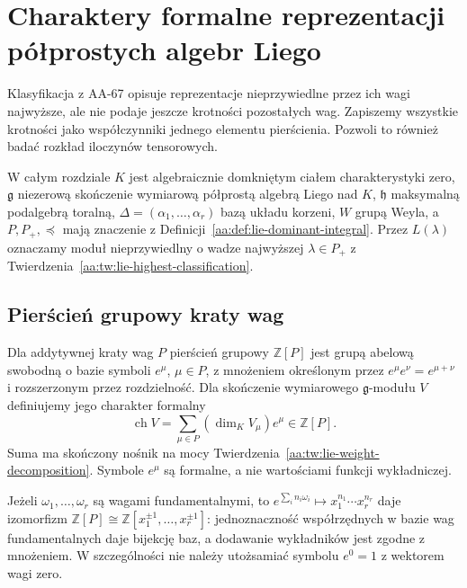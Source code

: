 \chapter[Charaktery reprezentacji]{Charaktery formalne reprezentacji półprostych algebr Liego}
\label{aa:ch:lie-formal-characters}

Klasyfikacja z AA-67 opisuje reprezentacje nieprzywiedlne przez ich wagi najwyższe, ale nie podaje jeszcze krotności pozostałych wag. Zapiszemy wszystkie krotności jako współczynniki jednego elementu pierścienia. Pozwoli to również badać rozkład iloczynów tensorowych.

W całym rozdziale $K$ jest algebraicznie domkniętym ciałem charakterystyki zero, $\mathfrak g$ niezerową skończenie wymiarową półprostą algebrą Liego nad $K$, $\mathfrak h$ maksymalną podalgebrą toralną, $\Delta=(\alpha_1,\ldots,\alpha_r)$ bazą układu korzeni, $W$ grupą Weyla, a $P,P_+,\preceq$ mają znaczenie z Definicji~\ref{aa:def:lie-dominant-integral}. Przez $L(\lambda)$ oznaczamy moduł nieprzywiedlny o wadze najwyższej $\lambda\in P_+$ z Twierdzenia~\ref{aa:tw:lie-highest-classification}.

\section{Pierścień grupowy kraty wag}

\begin{definicja}
\label{aa:def:lie-formal-character}
Dla addytywnej kraty wag $P$ pierścień grupowy $\mathbb Z[P]$ jest grupą abelową swobodną o bazie symboli $e^\mu$, $\mu\in P$, z mnożeniem określonym przez $e^\mu e^\nu=e^{\mu+\nu}$ i rozszerzonym przez rozdzielność. Dla skończenie wymiarowego $\mathfrak g$-modułu $V$ definiujemy jego charakter formalny
\[
 \operatorname{ch} V=\sum_{\mu\in P}(\dim_K V_\mu)e^\mu\in\mathbb Z[P].
\]
Suma ma skończony nośnik na mocy Twierdzenia~\ref{aa:tw:lie-weight-decomposition}. Symbole $e^\mu$ są formalne, a nie wartościami funkcji wykładniczej.
\end{definicja}

Jeżeli $\omega_1,\ldots,\omega_r$ są wagami fundamentalnymi, to $e^{\sum_i n_i\omega_i}\mapsto x_1^{n_1}\cdots x_r^{n_r}$ daje izomorfizm $\mathbb Z[P]\cong\mathbb Z[x_1^{\pm1},\ldots,x_r^{\pm1}]$: jednoznaczność współrzędnych w bazie wag fundamentalnych daje bijekcję baz, a dodawanie wykładników jest zgodne z mnożeniem. W szczególności nie należy utożsamiać symbolu $e^0=1$ z wektorem wagi zero.

